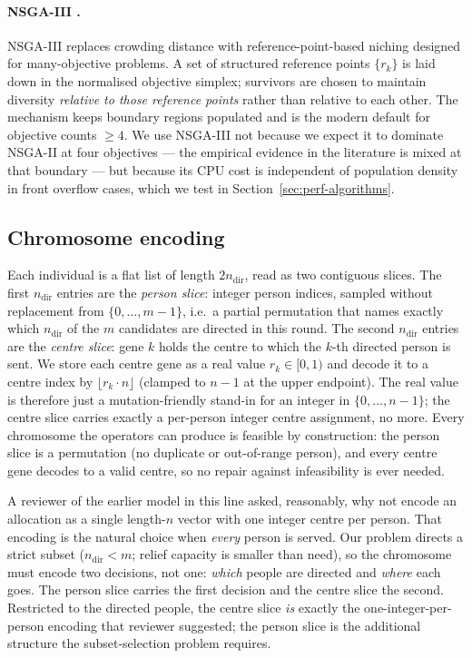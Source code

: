 \documentclass[applsci,article,submit,moreauthors,pdftex]{Definitions/mdpi}
\begin{document}
\paragraph{NSGA-III \cite{deb2014nsga3}.}
NSGA-III replaces crowding distance with reference-point-based niching
designed for many-objective problems. A set of structured reference points
$\{r_k\}$ is laid down in the normalised objective simplex; survivors are
chosen to maintain diversity \emph{relative to those reference points}
rather than relative to each other. The mechanism keeps boundary regions
populated and is the modern default for objective counts $\ge 4$. We use
NSGA-III not because we expect it to dominate NSGA-II at four objectives ---
the empirical evidence in the literature is mixed at that boundary --- but
because its CPU cost is independent of population density in front overflow
cases, which we test in Section~\ref{sec:perf-algorithms}.

\subsection{Chromosome encoding}\label{sec:algo-chromosome}

Each individual is a flat list of length $2 n_{\mathrm{dir}}$, read as two
contiguous slices. The first $n_{\mathrm{dir}}$ entries are the
\emph{person slice}: integer person indices, sampled without replacement from
$\{0, \ldots, m-1\}$, i.e.\ a partial permutation that names exactly which
$n_{\mathrm{dir}}$ of the $m$ candidates are directed in this round. The second
$n_{\mathrm{dir}}$ entries are the \emph{centre slice}: gene $k$ holds the centre
to which the $k$-th directed person is sent. We store each centre gene as a real
value $r_k \in [0, 1)$ and decode it to a centre index by
$\lfloor r_k \cdot n \rfloor$ (clamped to $n-1$ at the upper endpoint). The real
value is therefore just a mutation-friendly stand-in for an integer in
$\{0, \ldots, n-1\}$; the centre slice carries exactly a per-person integer
centre assignment, no more. Every chromosome the operators can produce is
feasible by construction: the person slice is a permutation (no duplicate or
out-of-range person), and every centre gene decodes to a valid centre, so no
repair against infeasibility is ever needed.

A reviewer of the earlier model in this line asked, reasonably, why not encode an
allocation as a single length-$n$ vector with one integer centre per person. That
encoding is the natural choice when \emph{every} person is served. Our problem
directs a strict subset ($n_{\mathrm{dir}} < m$; relief capacity is smaller than
need), so the chromosome must encode two decisions, not one: \emph{which} people
are directed and \emph{where} each goes. The person slice carries the first
decision and the centre slice the second. Restricted to the directed people, the
centre slice \emph{is} exactly the one-integer-per-person encoding that reviewer
suggested; the person slice is the additional structure the subset-selection
problem requires.
\end{document}
